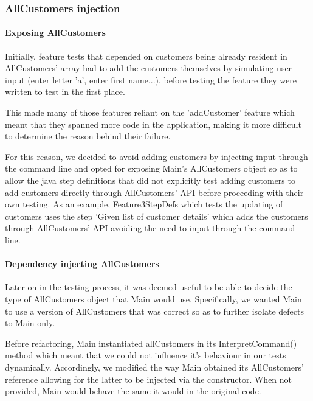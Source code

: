 \subsubsection{AllCustomers injection}
\label{sec:allcustomers-inject}

\paragraph{Exposing AllCustomers}
Initially, feature tests that depended on customers being already resident in AllCustomers' array had to add the customers themselves by simulating user input (enter letter 'a', enter first name...), before testing the feature they were written to test in the first place.
\par 
This made many of those features reliant on the 'addCustomer' feature which meant that they spanned more code in the application, making it more difficult to determine the reason behind their failure. 
\par 
For this reason, we decided to avoid adding customers by injecting input through the command line and opted for exposing Main's AllCustomers object so as to allow the java step definitions that did not explicitly test adding customers to add customers directly through AllCustomers' API before proceeding with their own testing. 
As an example, Feature3StepDefs which tests the updating of customers uses the step 'Given list of customer details' which adds the customers through AllCustomers' API avoiding the need to input through the command line. 

\paragraph{Dependency injecting AllCustomers}
Later on in the testing process, it was deemed useful to be able to decide the type of AllCustomers object that Main would use. Specifically, we wanted Main to use a version of AllCustomers that was correct so as to further isolate defects to Main only.
\par 
Before refactoring, Main instantiated allCustomers in its InterpretCommand() method which meant that we could not influence it's behaviour in our tests dynamically. Accordingly, we modified the way Main obtained its AllCustomers' reference allowing for the latter to be injected via the constructor. When not provided, Main would behave the same it would in the original code. 


